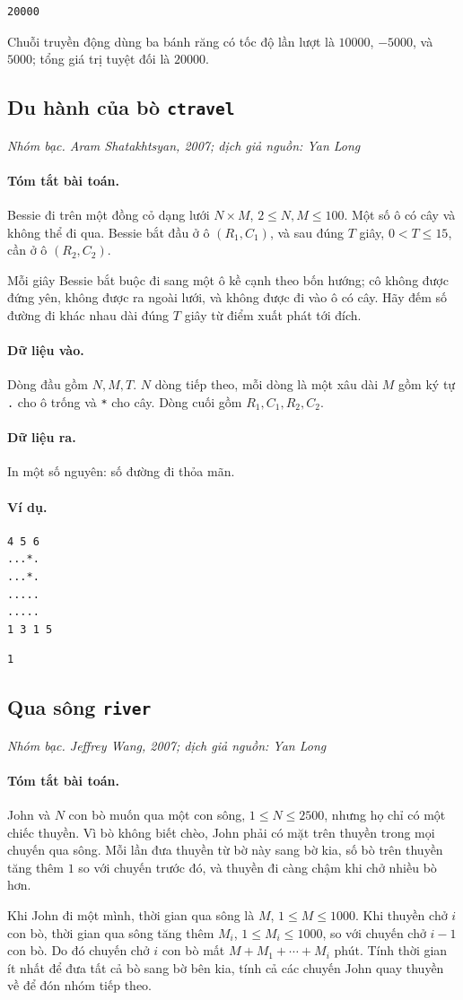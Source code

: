 \documentclass[11pt]{article}
\newcommand{\problem}[4]{%
  \subsection[#1 (#2)]{#1 \hfill {\normalsize\texttt{#2}}}%
  \noindent\textit{#3. #4}\par\smallskip
}
\newcommand{\iosec}[1]{\paragraph{#1}}
\begin{document}
\begin{verbatim}
20000
\end{verbatim}

Chuỗi truyền động dùng ba bánh răng có tốc độ lần lượt là \(10000\),
\(-5000\), và \(5000\); tổng giá trị tuyệt đối là \(20000\).

\problem{Du hành của bò}{ctravel}{Nhóm bạc}{Aram Shatakhtsyan, 2007; dịch giả nguồn: Yan Long}

\iosec{Tóm tắt bài toán.}
Bessie đi trên một đồng cỏ dạng lưới \(N\times M\),
\(2\le N,M\le 100\). Một số ô có cây và không thể đi qua. Bessie bắt đầu ở ô
\((R_1,C_1)\), và sau đúng \(T\) giây, \(0<T\le 15\), cần ở ô
\((R_2,C_2)\).

Mỗi giây Bessie bắt buộc đi sang một ô kề cạnh theo bốn hướng; cô không được
đứng yên, không được ra ngoài lưới, và không được đi vào ô có cây. Hãy đếm số
đường đi khác nhau dài đúng \(T\) giây từ điểm xuất phát tới đích.

\iosec{Dữ liệu vào.}
Dòng đầu gồm \(N,M,T\). \(N\) dòng tiếp theo, mỗi dòng là một xâu dài \(M\)
gồm ký tự \texttt{.} cho ô trống và \texttt{*} cho cây. Dòng cuối gồm
\(R_1,C_1,R_2,C_2\).

\iosec{Dữ liệu ra.}
In một số nguyên: số đường đi thỏa mãn.

\iosec{Ví dụ.}
\begin{verbatim}
4 5 6
...*.
...*.
.....
.....
1 3 1 5
\end{verbatim}

\begin{verbatim}
1
\end{verbatim}

\problem{Qua sông}{river}{Nhóm bạc}{Jeffrey Wang, 2007; dịch giả nguồn: Yan Long}

\iosec{Tóm tắt bài toán.}
John và \(N\) con bò muốn qua một con sông, \(1\le N\le 2500\), nhưng họ chỉ
có một chiếc thuyền. Vì bò không biết chèo, John phải có mặt trên thuyền
trong mọi chuyến qua sông. Mỗi lần đưa thuyền từ bờ này sang bờ kia, số bò
trên thuyền tăng thêm \(1\) so với chuyến trước đó, và thuyền đi càng chậm
khi chở nhiều bò hơn.

Khi John đi một mình, thời gian qua sông là \(M\), \(1\le M\le 1000\). Khi
thuyền chở \(i\) con bò, thời gian qua sông tăng thêm \(M_i\),
\(1\le M_i\le 1000\), so với chuyến chở \(i-1\) con bò. Do đó chuyến chở
\(i\) con bò mất \(M+M_1+\cdots+M_i\) phút. Tính thời gian ít nhất để đưa
tất cả bò sang bờ bên kia, tính cả các chuyến John quay thuyền về để đón
nhóm tiếp theo.
\end{document}

